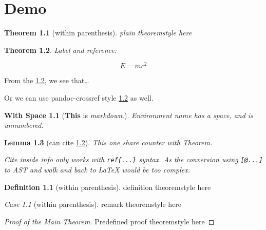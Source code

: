 \theoremstyle{plain}
\newtheorem{Theorem}{Theorem}[section]
\newtheorem{Lemma}[Theorem]{Lemma}
\newtheorem{Corollary}[Theorem]{Corollary}
\newtheorem*{With Space}{With Space}
\newtheorem{Proposition}{Proposition}[section]
\newtheorem{Conjecture}[Proposition]{Conjecture}
\newtheorem{WithoutSpace}{WithoutSpace}[section]
\newtheorem{KL}{Klein’s Lemma}[section]
\theoremstyle{definition}
\newtheorem{Definition}{Definition}[section]
\theoremstyle{remark}
\newtheorem{Case}{Case}[section]

\hypertarget{demo}{%
\chapter{Demo}\label{demo}}

\begin{Theorem}[within parenthesis]
plain theoremstyle \emph{here}
\end{Theorem}

\begin{Theorem}\label{simplestEquation}
\leavevmode{}%
Label and reference:

\[E=mc^2\]
\end{Theorem}

From the \ref{simplestEquation}, we see that\ldots{}

Or we can use pandoc-crossref style \ref{simplestEquation} as well.

\begin{With Space}[\textbf{This} is \emph{markdown}.]
Environment name has a space, and is unnumbered.
\end{With Space}

\begin{Lemma}[can cite \ref{simplestEquation}]
This one share counter with Theorem.

Cite inside info only works with \texttt{ref\{...\}} syntax. As the
conversion using \texttt{{[}@...{]}} to AST and walk and back to LaTeX
would be too complex.
\end{Lemma}

\begin{Definition}[within parenthesis]
definition theoremstyle here
\end{Definition}

\begin{Case}[within parenthesis]
remark theoremstyle here
\end{Case}

\begin{proof}[Proof of the Main Theorem]
Predefined proof theoremstyle here
\end{proof}

